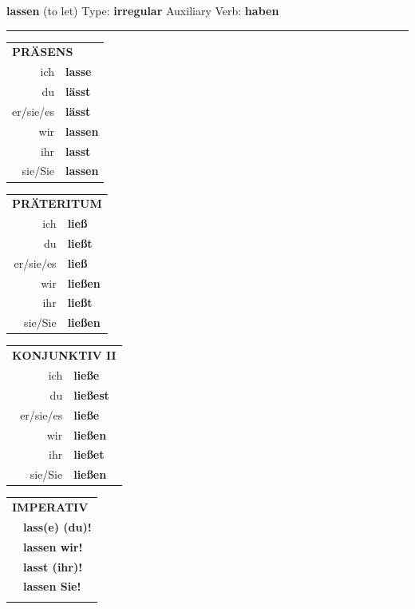 \documentclass[10pt,a4paper]{revtex4-2}
\begin{document}
\begin{verbbox}
    {\Large \bf lassen} (to let) \hfill Type: \textbf{irregular} \hfill Auxiliary Verb: \textbf{haben} 
     \vspace{5pt}
    \hrule
    \vspace{5pt}
  \begin{tabular}{rl}
     \multicolumn{2}{l}{\textbf{PRÄSENS} }\\
    ich & \textbf{lasse}\\
    du & \textbf{lässt}\\
    er/sie/es & \textbf{lässt}\\
    wir & \textbf{lassen}\\
    ihr & \textbf{lasst}\\
    sie/Sie & \textbf{lassen}\\
  \end{tabular}
  \hfill
     \begin{tabular}{rl}
    \multicolumn{2}{l}{\textbf{PRÄTERITUM} }\\
    ich & \textbf{ließ}\\
    du & \textbf{ließt}\\
    er/sie/es & \textbf{ließ}\\
    wir & \textbf{ließen}\\
    ihr & \textbf{ließt}\\
    sie/Sie & \textbf{ließen}\\
  \end{tabular}
     \hfill
     \begin{tabular}{rl}
    \multicolumn{2}{l}{\textbf{KONJUNKTIV II} }\\
    ich & \textbf{ließe}\\
    du & \textbf{ließest}\\
    er/sie/es & \textbf{ließe}\\
    wir & \textbf{ließen}\\
    ihr & \textbf{ließet}\\
    sie/Sie & \textbf{ließen}\\
  \end{tabular}
  \hfill
  \begin{tabular}{rl}
     \multicolumn{2}{l}{\textbf{IMPERATIV} }\\
   & \textbf{lass(e) (du)!}\\
   & \textbf{lassen wir!}\\
   & \textbf{lasst (ihr)!}\\
   & \textbf{lassen Sie!}\\
   & \vspace{10pt}
  \end{tabular}


\end{verbbox}
\end{document}
